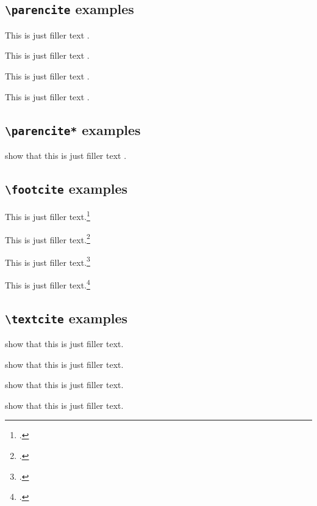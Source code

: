\documentclass[a4paper]{article}
\newcommand{\cmd}[1]{\texttt{\textbackslash #1}}
\begin{document}
\cite[59]{companion}

\cite[see][]{companion}

\cite[see][59--63]{companion}

\subsection*{\cmd{parencite} examples}

This is just filler text \parencite{companion}.

This is just filler text \parencite[59]{companion}.

This is just filler text \parencite[see][]{companion}.

This is just filler text \parencite[see][59--63]{companion}.

\subsection*{\cmd{parencite*} examples}

\citeauthor{companion} show that this is just filler
text \parencite*{companion}.

\subsection*{\cmd{footcite} examples}


This is just filler text.\footcite{companion}

This is just filler text.\footcite[59]{companion}

This is just filler text.\footcite[See][]{companion}

This is just filler text.\footcite[See][59--63]{companion}

\subsection*{\cmd{textcite} examples}

\textcite{companion} show that this is just filler text.

\textcite[59]{companion} show that this is just filler text.

\textcite[see][]{companion} show that this is just filler text.

\textcite[see][59--63]{companion} show that this is just filler text.
\end{document}
